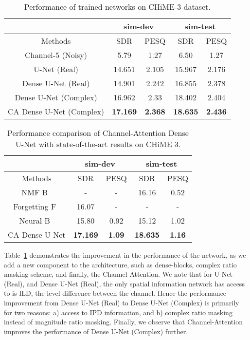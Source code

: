 \documentclass{article}
\begin{document}
\begin{table}[htb]
\setlength{\tabcolsep}{5pt}
\renewcommand{\arraystretch}{1.3}
\caption{Performance of trained networks on CHiME-3 dataset.}
\label{tab:res}
\centering
\begin{tabular}{c|c|c||c|c}
    \hline
    \hline
    \multirow{1}{*}{} &
      \multicolumn{2}{c}{sim-dev}  \vline &
      \multicolumn{2}{c}{sim-test} \\
     \hline
     Methods & SDR & PESQ & SDR & PESQ \\
     \hline
     Channel-5 (Noisy) &5.79 &1.27 &6.50 &1.27 \\
    \hline
    U-Net (Real) & 14.651 & 2.105 & 15.967 & 2.176 \\
    \hline
    Dense U-Net (Real) & 14.901 & 2.242 & 16.855 &  2.378 \\
    \hline
   Dense U-Net (Complex)& 16.962 & 2.33 & 18.402 &  2.404 \\
\hline
   CA Dense U-Net (Complex) & {\bf 17.169} & {\bf 2.368} &  {\bf 18.635} & {\bf 2.436}
\end{tabular}
\vspace{-6mm}
\end{table}
\begin{table}[htb]
\setlength{\tabcolsep}{5pt}
\renewcommand{\arraystretch}{1.3}
\caption{Performance comparison of Channel-Attention Dense U-Net with state-of-the-art results on CHiME 3.}
\label{tab:res_compare}
\centering
\begin{tabular}{c|c|c|c|c}
    \hline
    \hline
    \multirow{1}{*}{} &
      \multicolumn{2}{c}{sim-dev}  \vline &
      \multicolumn{2}{c}{sim-test} \\
	\hline
    Methods & SDR & PESQ & SDR & PESQ \\
    \hline
    NMF B~\cite{nmfb} & - & - & 16.16 & 0.52 \\
    \hline
    Forgetting F~\cite{forget} & 16.07 & - & - & -\\
    \hline
    Neural B~\cite{erdogan} & 15.80 & 0.92 & 15.12 & 1.02\\
    \hline
    CA Dense U-Net & {\bf 17.169} & {\bf 1.09} & {\bf18.635} & {\bf 1.16} \\
\end{tabular}
\vspace{-4mm}
\end{table}
 
Table~\ref{tab:res} demonstrates the improvement in the performance of the network, as we add a new component to the architecture, such as dense-blocks, complex ratio masking scheme, and finally, the Channel-Attention. We note that for U-Net (Real), and Dense U-Net (Real), the only spatial information network has access to is ILD, the level difference between the channel. Hence the performance improvement from Dense U-Net (Real) to Dense U-Net (Complex) is primarily for two reasons: a) access to IPD information, and b) complex ratio masking instead of magnitude ratio masking. Finally, we observe that Channel-Attention improves the performance of Dense U-Net (Complex) further.
\end{document}
